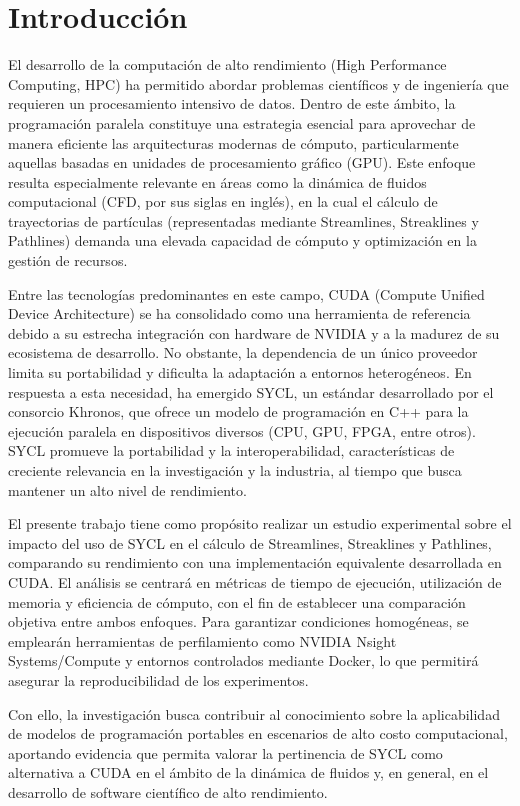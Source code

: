 \section*{Introducción}

El desarrollo de la computación de alto rendimiento (High Performance Computing, HPC) ha permitido abordar problemas científicos y de ingeniería que requieren un procesamiento intensivo de datos. Dentro de este ámbito, la programación paralela constituye una estrategia esencial para aprovechar de manera eficiente las arquitecturas modernas de cómputo, particularmente aquellas basadas en unidades de procesamiento gráfico (GPU). Este enfoque resulta especialmente relevante en áreas como la dinámica de fluidos computacional (CFD, por sus siglas en inglés), en la cual el cálculo de trayectorias de partículas (representadas mediante Streamlines, Streaklines y Pathlines) demanda una elevada capacidad de cómputo y optimización en la gestión de recursos.


Entre las tecnologías predominantes en este campo, CUDA (Compute Unified Device Architecture) se ha consolidado como una herramienta de referencia debido a su estrecha integración con hardware de NVIDIA y a la madurez de su ecosistema de desarrollo. No obstante, la dependencia de un único proveedor limita su portabilidad y dificulta la adaptación a entornos heterogéneos. En respuesta a esta necesidad, ha emergido SYCL, un estándar desarrollado por el consorcio Khronos, que ofrece un modelo de programación en C++ para la ejecución paralela en dispositivos diversos (CPU, GPU, FPGA, entre otros). SYCL promueve la portabilidad y la interoperabilidad, características de creciente relevancia en la investigación y la industria, al tiempo que busca mantener un alto nivel de rendimiento.


El presente trabajo tiene como propósito realizar un estudio experimental sobre el impacto del uso de SYCL en el cálculo de Streamlines, Streaklines y Pathlines, comparando su rendimiento con una implementación equivalente desarrollada en CUDA. El análisis se centrará en métricas de tiempo de ejecución, utilización de memoria y eficiencia de cómputo, con el fin de establecer una comparación objetiva entre ambos enfoques. Para garantizar condiciones homogéneas, se emplearán herramientas de perfilamiento como NVIDIA Nsight Systems/Compute y entornos controlados mediante Docker, lo que permitirá asegurar la reproducibilidad de los experimentos.


Con ello, la investigación busca contribuir al conocimiento sobre la aplicabilidad de modelos de programación portables en escenarios de alto costo computacional, aportando evidencia que permita valorar la pertinencia de SYCL como alternativa a CUDA en el ámbito de la dinámica de fluidos y, en general, en el desarrollo de software científico de alto rendimiento.

